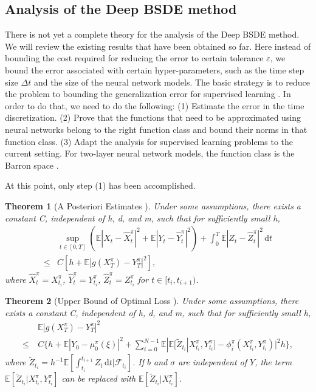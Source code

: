 \documentclass[12pt]{article}
\newtheorem{theorem}{Theorem}
\theoremstyle{definition}
\newcommand{\E}{\mathbb{E}}
\newcommand{\eps}{\varepsilon}
\newcommand{\rmd}{\mathrm{d}}
\begin{document}
\subsection{Analysis of the Deep BSDE method}
There is not yet a complete theory for the analysis of the Deep BSDE method.  We will review the existing results
that have been obtained so far.
Here instead of bounding the cost required  for reducing the error to certain tolerance $\eps$, we bound the error 
associated with certain hyper-parameters, such as the time step size $\Delta t$ and the size of the neural network models.
The basic strategy is to reduce the problem to bounding the generalization error for supervised learning
\cite{EMaWu2019machine}. In order to do that, we need to do the following: (1) Estimate the error in the time discretization. 
(2) Prove that the functions that need to be approximated using neural networks belong to the right function class
and bound their norms in that function class.  (3) Adapt the analysis for supervised learning problems to the current setting.
For two-layer neural network models, the function class is the Barron space \cite{EMaWu2019barron}.

At this point, only step (1) has been accomplished.

\begin{theorem}[A Posteriori Estimates \cite{Han2018convergence}]
  Under some assumptions, there exists a constant C, independent of h, d, and m, such that for sufficiently small h,
  \begin{equation}
  \begin{aligned}
    &\sup_{ t \in [0,T]} (\E|X_t - \hat{X}_t^{\pi}|^2 + \E|Y_t - \hat{Y}_t^{\pi}|^2) + \int_{0 }^{T} \E|Z_t - \hat{Z}_t^\pi|^2 \, \mathrm{d}t \\ 
    \le &C[h +  \E|g(X_{T}^\pi) - Y_T^{\pi}|^2],
    \end{aligned}
    \end{equation}
  where $\hat{X}_t^{\pi} = X_{t_i}^\pi$, $\hat{Y}_t^{\pi} = Y_{t_i}^\pi$, $\hat{Z}_t^{\pi} = Z_{t_i}^\pi$ for $t \in [t_i,t_{i+1})$.
\end{theorem}

\begin{theorem}[Upper Bound of Optimal Loss \cite{Han2018convergence}]
Under some assumptions, there exists a constant C, independent of h, d, and m, such that for sufficiently small h,
  \begin{equation}
  \begin{aligned}
      &\E|g(X_T^\pi) - Y_T^{\pi}|^2 \\
      \le~& C\Big\{h +  \E|Y_0 - \mu_0^\pi(\xi)|^2 + \sum_{i = 0}^{N-1}\E|\E[\tilde{Z}_{t_i}|X_{t_i}^\pi,Y_{t_i}^\pi] - \phi_i^\pi(X_{t_i}^\pi,Y_{t_i}^\pi)|^2h \Big\},
  \end{aligned}
  \end{equation}
where $\tilde{Z}_{t_i} =h^{-1}\E[\int_{t_i}^{t_{i+1}}Z_t\,\rmd t|\mathcal{F}_{t_i}]$. If $b$ and $\sigma$ are independent of $Y$, the term $\E[\tilde{Z}_{t_i}|X_{t_i}^\pi,Y_{t_i}^\pi]$ can be replaced with $\E[\tilde{Z}_{t_i}|X_{t_i}^\pi]$. 
\end{theorem}
\end{document}
